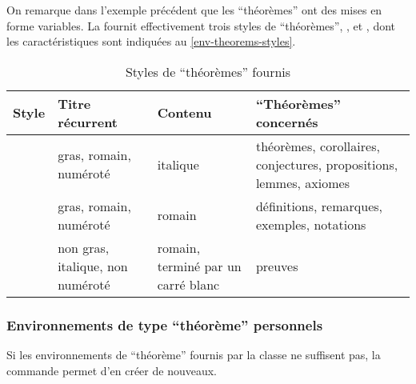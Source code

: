 \documentclass[french,nolocaltoc]{nwejmart}
\newtheorem[title=Fait,style=definition]{fact}
\begin{document}
On remarque dans l'exemple précédent que les \enquote{théorèmes} ont des mises
en forme variables. La \nwejmauthorcl{} fournit effectivement trois styles de
\enquote{théorèmes}, ,  et
, dont les caractéristiques sont indiquées au
\vref{env-theorems-styles}.

\begin{table}
  \centering
  \begin{tabulary}{\linewidth}{lLLL}
Style                 & Titre récurrent                  & Contenu                            & \enquote{Théorèmes} concernés               \\\toprule
{}    & gras, romain, numéroté           & italique
                      & théorèmes, corollaires, conjectures, propositions, lemmes, axiomes                                                  \\\midrule
{} & gras, romain, numéroté           & romain                             & définitions, remarques, exemples, notations \\\midrule
{}      & non gras, italique, non numéroté & romain, terminé par un carré blanc & preuves                                     \\\bottomrule
  \end{tabulary}
  \caption{Styles de \enquote{théorèmes} fournis}
  \label{env-theorems-styles}
\end{table}

\subsubsection{Environnements de type \enquote{théorème} personnels}
\label{sec:envir-de-type-1}

Si les environnements de \enquote{théorème} fournis par la classe ne suffisent
pas, la commande  permet d'en créer de nouveaux.
\end{document}
